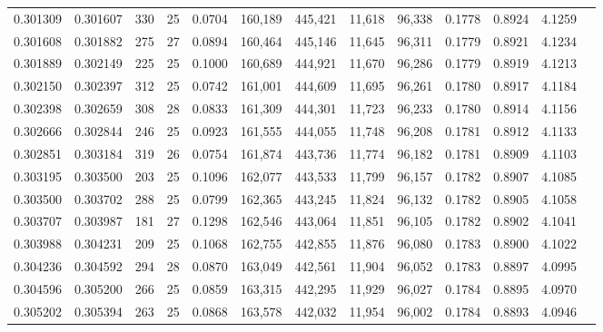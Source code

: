 \begin{tabular}{rrrrrrrrrrrrr}
0.301309 & 0.301607 &   330 &  25 &                                     0.0704 & 160,189 & 445,421 &  11,618 &  96,338 & 0.1778 & 0.8924 & 4.1259 \\
0.301608 & 0.301882 &   275 &  27 &                                     0.0894 & 160,464 & 445,146 &  11,645 &  96,311 & 0.1779 & 0.8921 & 4.1234 \\
0.301889 & 0.302149 &   225 &  25 &                                     0.1000 & 160,689 & 444,921 &  11,670 &  96,286 & 0.1779 & 0.8919 & 4.1213 \\
0.302150 & 0.302397 &   312 &  25 &                                     0.0742 & 161,001 & 444,609 &  11,695 &  96,261 & 0.1780 & 0.8917 & 4.1184 \\
0.302398 & 0.302659 &   308 &  28 &                                     0.0833 & 161,309 & 444,301 &  11,723 &  96,233 & 0.1780 & 0.8914 & 4.1156 \\
0.302666 & 0.302844 &   246 &  25 &                                     0.0923 & 161,555 & 444,055 &  11,748 &  96,208 & 0.1781 & 0.8912 & 4.1133 \\
0.302851 & 0.303184 &   319 &  26 &                                     0.0754 & 161,874 & 443,736 &  11,774 &  96,182 & 0.1781 & 0.8909 & 4.1103 \\
0.303195 & 0.303500 &   203 &  25 &                                     0.1096 & 162,077 & 443,533 &  11,799 &  96,157 & 0.1782 & 0.8907 & 4.1085 \\
0.303500 & 0.303702 &   288 &  25 &                                     0.0799 & 162,365 & 443,245 &  11,824 &  96,132 & 0.1782 & 0.8905 & 4.1058 \\
0.303707 & 0.303987 &   181 &  27 &                                     0.1298 & 162,546 & 443,064 &  11,851 &  96,105 & 0.1782 & 0.8902 & 4.1041 \\
0.303988 & 0.304231 &   209 &  25 &                                     0.1068 & 162,755 & 442,855 &  11,876 &  96,080 & 0.1783 & 0.8900 & 4.1022 \\
0.304236 & 0.304592 &   294 &  28 &                                     0.0870 & 163,049 & 442,561 &  11,904 &  96,052 & 0.1783 & 0.8897 & 4.0995 \\
0.304596 & 0.305200 &   266 &  25 &                                     0.0859 & 163,315 & 442,295 &  11,929 &  96,027 & 0.1784 & 0.8895 & 4.0970 \\
0.305202 & 0.305394 &   263 &  25 &                                     0.0868 & 163,578 & 442,032 &  11,954 &  96,002 & 0.1784 & 0.8893 & 4.0946 \\

\end{tabular}
